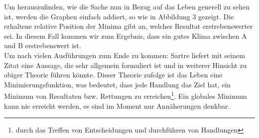 \documentclass[12pt,a4paper,oneside]{article}
\begin{document}
  Um herauszufinden, wie die Sache nun in Bezug auf das Leben generell zu sehen ist, werden die Graphen einfach addiert, so wie in Abbildung 3 gezeigt. Die erhaltene relative Position der Minima gibt an, welches Resultat erstrebenswerter sei. In diesem Fall kommen wir zum Ergebnis, dass ein gutes Klima zwischen A und B erstrebenswert ist. \\
  
  Um nach vielen Ausführungen zum Ende zu kommen: Sartre liefert mit seinem Zitat eine Aussage, die sehr allgemein formuliert ist und in weiterer Hinsicht zu obiger Theorie führen könnte. Dieser Theorie zufolge ist das Leben eine Minimierungsfunktion, was bedeutet, dass jede Handlung das Ziel hat, ein Minimum von Resultaten bzw. Rettungen zu erreichen\footnote{durch das Treffen von Entscheidungen und durchführen von Handlungen}. Ein globales Minimum kann nie erreicht werden, es sind im Moment nur Annäherungen denkbar. \\
  
\end{document}
